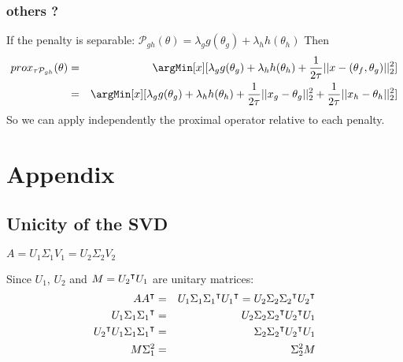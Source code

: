 \documentclass{article}
\begin{document}
\boxResult{
\[
prox {\tau \mathcal{P}_G}(\theta) =prox_{\tau \mathcal{P}_G}(prox_{\tau \mathcal{P}_1}(\theta)) 
\]
}

\subsubsection{others ?}
\label{sec:orgbeacd7a}

If the penalty is separable:  \(\mathcal{P}_{gh}(\theta)=\lambda_g g(\theta_g) + \lambda_h h(\theta_h) \)
Then
\begin{eqnarray*}
prox_{\tau \mathcal{P}_{gh}}(\theta) &=& \argMin[x][\lambda_g g(\theta_g) + \lambda_h h(\theta_h)+\frac{1}{2\tau} ||x-(\theta_f,\theta_g)||_2^2] \\
&=& \argMin[x][\lambda_g g(\theta_g) + \lambda_h h(\theta_h)+\frac{1}{2\tau} ||x_g-\theta_g||_2^2 + \frac{1}{2\tau} ||x_h-\theta_h||_2^2] \\
\end{eqnarray*}
So we can apply independently the proximal operator relative to each penalty.

\clearpage

\section{Appendix}
\label{sec:org539702e}

\subsection{Unicity of the SVD}
\label{sec:org78ca640}

\(A = U_1 \Sigma_1 V_1 = U_2 \Sigma_2 V_2\) 

\bigskip

Since \(U_1\), \(U_2\) and \(M = {U_2}^\intercal U_1\) are unitary matrices:
\begin{eqnarray*}
A {A}^\intercal &=&   U_1 \Sigma_1 {\Sigma_1}^\intercal {U_1}^\intercal =  U_2 \Sigma_2 {\Sigma_2}^\intercal  {U_2}^\intercal  \\
U_1 \Sigma_1 {\Sigma_1}^\intercal &=&  U_2 \Sigma_2 {\Sigma_2}^\intercal  {U_2}^\intercal U_1  \\
{U_2}^\intercal U_1 \Sigma_1 {\Sigma_1}^\intercal &=&  \Sigma_2 {\Sigma_2}^\intercal  {U_2}^\intercal U_1  \\
M \Sigma_1^2  &=& \Sigma_2^2   M  \\
\end{eqnarray*}
\end{document}
